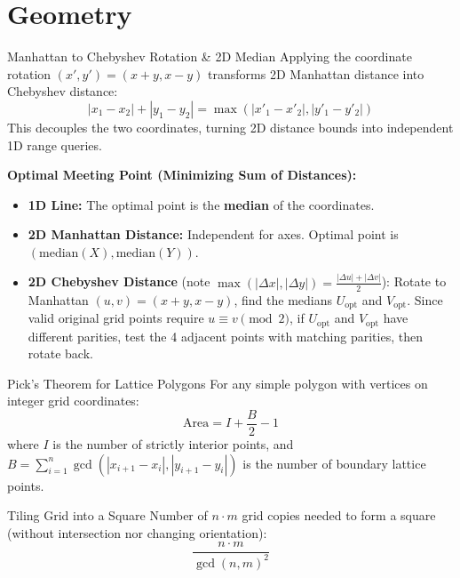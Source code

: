 \documentclass[10pt]{article}
\begin{document}
\newpage
\section{Geometry}

\begin{conceptbox}{Manhattan to Chebyshev Rotation \& 2D Median}
    Applying the coordinate rotation $(x', y') = (x + y, x - y)$ transforms 2D Manhattan distance into Chebyshev distance:
    \[ |x_1 - x_2| + |y_1 - y_2| = \max(|x'_1 - x'_2|, |y'_1 - y'_2|) \]
    This decouples the two coordinates, turning 2D distance bounds into independent 1D range queries.

    \textbf{Optimal Meeting Point (Minimizing Sum of Distances):}
    \begin{itemize}
        \item \textbf{1D Line:} The optimal point is the \textbf{median} of the coordinates.
        \item \textbf{2D Manhattan Distance:} Independent for axes. Optimal point is $(\text{median}(X), \text{median}(Y))$.
        \item \textbf{2D Chebyshev Distance} (note $\max(|\Delta x|, |\Delta y|) = \frac{|\Delta u| + |\Delta v|}{2}$): Rotate to Manhattan $(u, v) = (x+y, x-y)$, find the medians $U_{\text{opt}}$ and $V_{\text{opt}}$. Since valid original grid points require $u \equiv v \pmod 2$, if $U_{\text{opt}}$ and $V_{\text{opt}}$ have different parities, test the 4 adjacent points with matching parities, then rotate back.
    \end{itemize}
\end{conceptbox}

\begin{conceptbox}{Pick's Theorem for Lattice Polygons}
    For any simple polygon with vertices on integer grid coordinates:
    \[ \text{Area} = I + \frac{B}{2} - 1 \]
    where $I$ is the number of strictly interior points, and $B = \sum_{i=1}^n \gcd(|x_{i+1} - x_i|, |y_{i+1} - y_i|)$ is the number of boundary lattice points.
\end{conceptbox}

\begin{conceptbox}{Tiling Grid into a Square}
    Number of $n \cdot m$ grid copies needed to form a square (without intersection nor changing orientation):
    \[ \frac{n \cdot m}{\gcd(n, m)^2} \]
\end{conceptbox}
\end{document}
